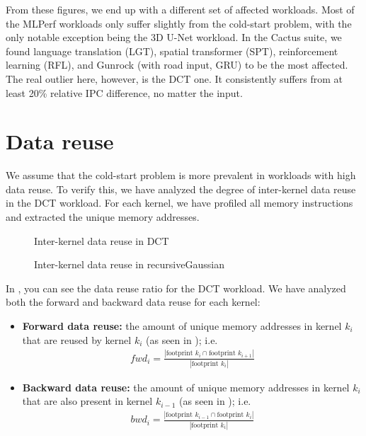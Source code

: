From these figures, we end up with a different set of affected workloads.
Most of the MLPerf workloads only suffer slightly from the cold-start problem, with the only notable exception being the 3D U-Net workload.
In the Cactus suite, we found language translation (LGT), spatial transformer (SPT), reinforcement learning (RFL), and Gunrock (with road input, GRU) to be the most affected.
The real outlier here, however, is the DCT one.
It consistently suffers from at least 20\% relative IPC difference, no matter the input.

\FloatBarrier

\section{Data reuse}\label{sec:data-reuse}
We assume that the cold-start problem is more prevalent in workloads with high data reuse.
To verify this, we have analyzed the degree of inter-kernel data reuse in the DCT workload.
For each kernel, we have profiled all memory instructions and extracted the unique memory addresses.

\begin{figure}[htb]
    \centering
    \caption{Inter-kernel data reuse in DCT}
    \label{fig:dct_reuse}
\end{figure}

\begin{figure}[hbt]
    \centering
    \caption{Inter-kernel data reuse in recursiveGaussian}
    \label{fig:recg_reuse}
\end{figure}

In , you can see the data reuse ratio for the DCT workload.
We have analyzed both the forward and backward data reuse for each kernel:
\begin{itemize}
    \item \textbf{Forward data reuse:} the amount of unique memory addresses in kernel $k_{i}$ that are reused by kernel $k_{i}$ (as seen in ); i.e.
    \begin{align}
        fwd_i = \frac{|\text{footprint } k_{i} \cap \text{footprint } k_{i+1}|}{|\text{footprint } k_{i}|}
    \end{align}
    \item \textbf{Backward data reuse:} the amount of unique memory addresses in kernel $k_{i}$ that are also present in kernel $k_{i-1}$ (as seen in ); i.e.
    \begin{align}
        bwd_i = \frac{|\text{footprint } k_{i-1} \cap \text{footprint } k_i|}{|\text{footprint } k_i|}
    \end{align}
\end{itemize}

